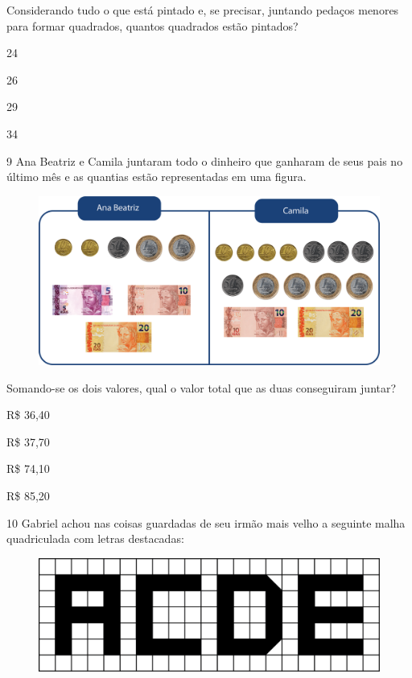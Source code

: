 Considerando tudo o que está pintado e, se precisar, juntando pedaços
menores para formar quadrados, quantos quadrados estão pintados?

\begin{escolha}
\item
  24
\item
  26
\item
  29
\item
  34
\end{escolha}

\pagebreak
\num{9} Ana Beatriz e Camila juntaram todo o dinheiro que ganharam de seus pais no
último mês e as quantias estão representadas em uma figura.

\begin{figure}[htpb!]
\centering
\includegraphics[width=\textwidth]{./media/image95.png}
\end{figure}

Somando-se os dois valores, qual o valor total que as duas conseguiram juntar?

\begin{multicols}{2}
\begin{escolha}
\item
  R\$ 36,40
\item
  R\$ 37,70
\item
  R\$ 74,10
\item
  R\$ 85,20
\end{escolha}
\end{multicols}

\num{10} Gabriel achou nas coisas guardadas de seu irmão mais velho a seguinte malha quadriculada com letras destacadas:

\begin{figure}[htpb!]
\centering
\includegraphics[width=\textwidth]{./media/image96.png}
\end{figure}


